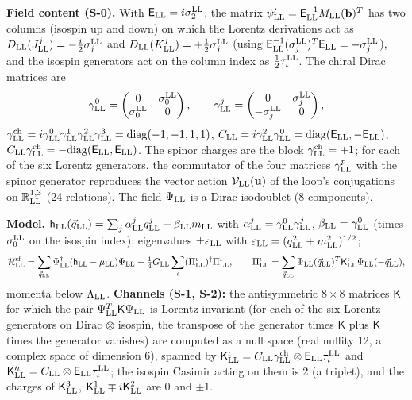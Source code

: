 \documentclass[
  10pt,
]{article}
\begin{document}
\textbf{Field content (S-0).} With
\(\mathsf E_{\rm LL}=i\sigma^{\rm LL}_2\), the matrix
\(\psi'_{\rm LL}=\mathsf E_{\rm LL}^{-1}M_{\rm LL}(\mathbf b)^T\) has
two columns (isospin up and down) on which the Lorentz derivations act
as \(D_{\rm LL}(J^j_{\rm LL})=-\tfrac{i}{2}\sigma^{\rm LL}_j\) and
\(D_{\rm LL}(K^j_{\rm LL})=+\tfrac12\sigma^{\rm LL}_j\) (using
\(\mathsf E_{\rm LL}^{-1}(\sigma^{\rm LL}_j)^T\mathsf E_{\rm LL}=-\sigma^{\rm LL}_j\)),
and the isospin generators act on the column index as
\(\tfrac12\tau^{\rm LL}_\iota\). The chiral Dirac matrices are
\[\gamma^0_{\rm LL}=\begin{pmatrix}0&\sigma^{\rm LL}_0\\\sigma^{\rm LL}_0&0\end{pmatrix},\qquad
\gamma^j_{\rm LL}=\begin{pmatrix}0&\sigma^{\rm LL}_j\\-\sigma^{\rm LL}_j&0\end{pmatrix},\]
\(\gamma^{\rm ch}_{\rm LL}=i\gamma^0_{\rm LL}\gamma^1_{\rm LL}\gamma^2_{\rm LL}\gamma^3_{\rm LL}=\mathrm{diag}(-1,-1,1,1)\),
\(C_{\rm LL}=i\gamma^2_{\rm LL}\gamma^0_{\rm LL}=\mathrm{diag}(\mathsf E_{\rm LL},-\mathsf E_{\rm LL})\),
\(C_{\rm LL}\gamma^{\rm ch}_{\rm LL}=-\mathrm{diag}(\mathsf E_{\rm LL},\mathsf E_{\rm LL})\).
The spinor charges are the block \(\gamma^{\rm ch}_{\rm LL}=+1\); for
each of the six Lorentz generators, the commutator of the four matrices
\(\gamma^p_{\rm LL}\) with the spinor generator reproduces the vector
action \(\mathcal V_{\rm LL}(\mathbf u)\) of the loop's conjugations on
\(\mathbb R^{1,3}_{\rm LL}\) (24 relations). The field \(\Psi_{\rm LL}\)
is a Dirac isodoublet (8 components).

\textbf{Model.}
\(\mathsf h_{\rm LL}(\vec q_{\rm LL})=\sum_j\alpha^j_{\rm LL}q^j_{\rm LL}+\beta_{\rm LL}m_{\rm LL}\)
with \(\alpha^j_{\rm LL}=\gamma^0_{\rm LL}\gamma^j_{\rm LL}\),
\(\beta_{\rm LL}=\gamma^0_{\rm LL}\) (times \(\sigma^{\rm LL}_0\) on the
isospin index); eigenvalues \(\pm\varepsilon_{\rm LL}\) with
\(\varepsilon_{\rm LL}=(q_{\rm LL}^2+m_{\rm LL}^2)^{1/2}\);
\[\mathcal H^{\rm sf}_{\rm LL}=\sum_{\vec q_{\rm LL}}\Psi^\dagger_{\rm LL}(\mathsf h_{\rm LL}-\mu_{\rm LL})\Psi_{\rm LL}-\tfrac14G_{\rm LL}\sum_\iota(\Pi^\iota_{\rm LL})^\dagger\Pi^\iota_{\rm LL},\qquad
\Pi^\iota_{\rm LL}=\sum_{\vec q_{\rm LL}}\Psi_{\rm LL}(\vec q_{\rm LL})^T\mathsf K^\iota_{\rm LL}\Psi_{\rm LL}(-\vec q_{\rm LL}),\]
momenta below \(\Lambda_{\rm LL}\). \textbf{Channels (S-1, S-2):} the
antisymmetric \(8\times8\) matrices \(\mathsf K\) for which the pair
\(\Psi^T_{\rm LL}\mathsf K\Psi_{\rm LL}\) is Lorentz invariant (for each
of the six Lorentz generators on Dirac \(\otimes\) isospin, the
transpose of the generator times \(\mathsf K\) plus \(\mathsf K\) times
the generator vanishes) are computed as a null space (real nullity 12, a
complex space of dimension 6), spanned by
\(\mathsf K^\iota_{\rm LL}=C_{\rm LL}\gamma^{\rm ch}_{\rm LL}\otimes\mathsf E_{\rm LL}\tau^{\rm LL}_\iota\)
and
\(\mathsf K'^\iota_{\rm LL}=C_{\rm LL}\otimes\mathsf E_{\rm LL}\tau^{\rm LL}_\iota\);
the isospin Casimir acting on them is 2 (a triplet), and the charges of
\(\mathsf K^3_{\rm LL}\),
\(\mathsf K^1_{\rm LL}\mp i\mathsf K^2_{\rm LL}\) are 0 and \(\pm1\).
\end{document}
